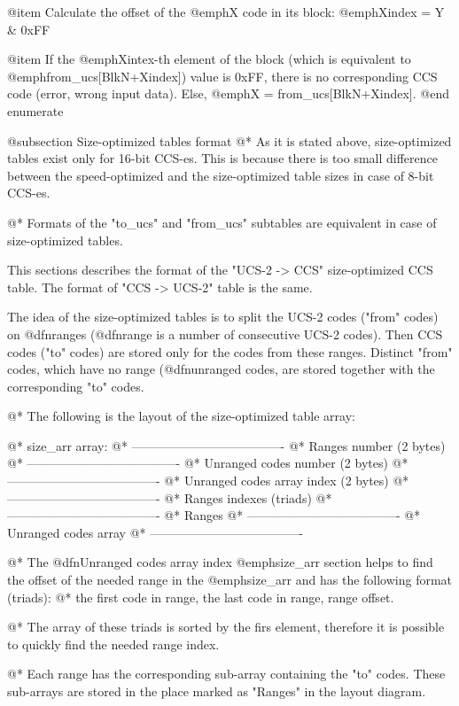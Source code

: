 @item Calculate the offset of the @emph{X} code in its block: 
@emph{Xindex = Y & 0xFF}

@item If the @emph{Xintex}-th element of the block (which is equivalent to
@emph{from_ucs[BlkN+Xindex]}) value is 0xFF, there is no corresponding
CCS code (error, wrong input data). Else, @emph{X = from_ucs[BlkN+Xindex]}.
@end enumerate

@subsection Size-optimized tables format
@*
As it is stated above, size-optimized tables exist only for 16-bit CCS-es.
This is because there is too small difference between the speed-optimized
and the size-optimized table sizes in case of 8-bit CCS-es.

@*
Formats of the "to_ucs" and "from_ucs" subtables are equivalent in case of
size-optimized tables.

This sections describes the format of the "UCS-2 -> CCS" size-optimized
CCS table. The format of "CCS -> UCS-2" table is the same.

The idea of the size-optimized tables is to split the UCS-2 codes
("from" codes) on @dfn{ranges} (@dfn{range} is a number of consecutive UCS-2 codes).
Then CCS codes ("to" codes) are stored only for the codes from these
ranges. Distinct "from" codes, which have no range (@dfn{unranged codes}, are stored
together with the corresponding "to" codes.

@*
The following is the layout of the size-optimized table array:

@*
size_arr array:
@*
-------------------------------------
@*
Ranges number (2 bytes)
@*
-------------------------------------
@*
Unranged codes number (2 bytes)
@*
-------------------------------------
@*
Unranged codes array index (2 bytes)
@*
-------------------------------------
@*
Ranges indexes (triads)
@*
-------------------------------------
@*
Ranges
@*
-------------------------------------
@*
Unranged codes array
@*
-------------------------------------

@*
The @dfn{Unranged codes array index} @emph{size_arr} section helps to find
the offset of the needed range in the @emph{size_arr} and has
the following format (triads):
@*
the first code in range, the last code in range, range offset.

@*
The array of these triads is sorted by the firs element, therefore it is
possible to quickly find the needed range index.

@*
Each range has the corresponding sub-array containing the "to" codes. These
sub-arrays are stored in the place marked as "Ranges" in the layout
diagram. 

